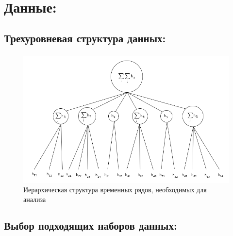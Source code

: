 \documentclass[c, dvipsnames]{beamer}  %
\begin{document}
\section{Данные: } 

\subsection{Трехуровневая структура данных:} 


\begin{frame}[shrink=5]
\frametitle{\insertsection} 
\framesubtitle{\insertsubsection}



\begin{figure}
	\centering
	\includegraphics[width=0.8\linewidth]{Screenshot51}
	\caption{Иерархическая структура временных рядов, необходимых для анализа}
	\label{fig:screenshot51}
\end{figure}



\end{frame}


%
%


\subsection{Выбор подходящих наборов данных:} 
\end{document}
